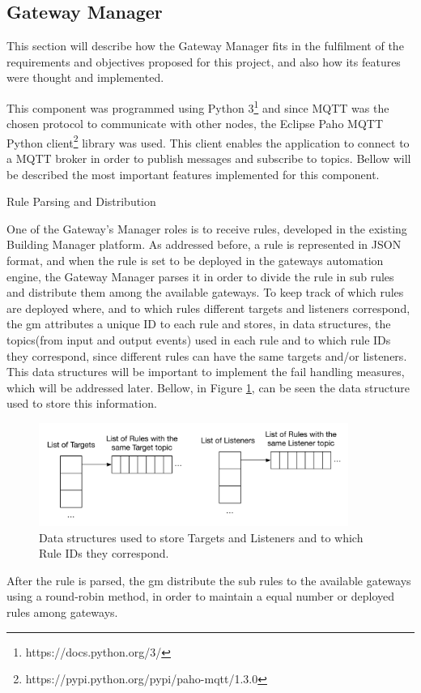 \subsection{Gateway Manager}
\label{arch:gm}

This section will describe how the Gateway Manager fits in the fulfilment of the requirements and objectives proposed for this project, and also how its features were thought and implemented. 


This component was programmed using Python 3\footnote{https://docs.python.org/3/} and since MQTT was the chosen protocol to communicate with other nodes, the Eclipse Paho MQTT Python client\footnote{https://pypi.python.org/pypi/paho-mqtt/1.3.0} library was used. This client enables the application to connect to a MQTT broker in order to publish messages and subscribe to topics. Bellow will be described the most important features implemented for this component.


\begin{Paragraph}{Rule Parsing and Distribution}
	
One of the Gateway's Manager roles is to receive rules, developed in the existing Building Manager platform. As addressed before, a rule is represented in JSON format, and when the rule is set to be deployed in the gateways automation engine, the Gateway Manager parses it in order to divide the rule in sub rules and distribute them among the available gateways. To keep track of which rules are deployed where, and to which rules different targets and listeners correspond, the \ac{gm} attributes a unique ID to each rule and stores, in data structures, the topics(from input and output events) used in each rule and to which rule IDs they correspond, since different rules can have the same targets and/or listeners. This data structures will be important to implement the fail handling measures, which will be addressed later. Bellow, in Figure \ref{fig:parser_struct}, can be seen the data structure used to store this information.

\begin{figure}[H]
	\centering
	\includegraphics[width=0.9\textwidth]{figures/parser_struct.png}
	\caption{Data structures used to store Targets and Listeners and to which Rule IDs they correspond.}
	\label{fig:parser_struct}
\end{figure}

After the rule is parsed, the \ac{gm} distribute the sub rules to the available gateways using a round-robin method, in order to maintain a equal number or deployed rules among gateways.

\end{Paragraph}

